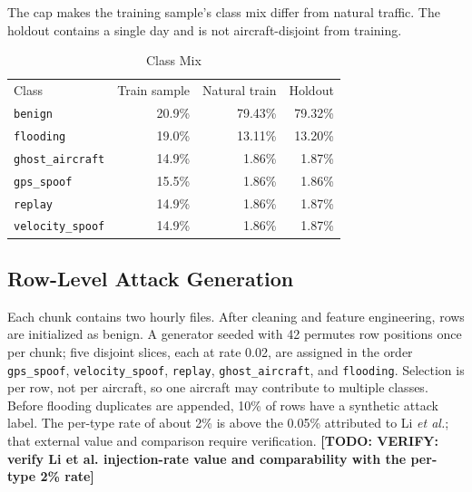 \documentclass[conference]{IEEEtran}
\newcommand{\todo}[1]{\textbf{[TODO: #1]}}
\newcommand{\benign}{\texttt{benign}}
\newcommand{\gps}{\texttt{gps\_spoof}}
\newcommand{\vel}{\texttt{velocity\_spoof}}
\newcommand{\replay}{\texttt{replay}}
\newcommand{\ghost}{\texttt{ghost\_aircraft}}
\newcommand{\flood}{\texttt{flooding}}
\begin{document}
The cap makes the training sample's class mix differ from natural traffic. The holdout contains a single day and is not aircraft-disjoint from training.

\begin{table}[t]\caption{Class Mix}\label{tab:mix}\centering\footnotesize

\begin{tabular}{lrrr}\toprule Class & Train sample & Natural train & Holdout \\

\benign & 20.9\% & 79.43\% & 79.32\% \\

\flood & 19.0\% & 13.11\% & 13.20\% \\

\ghost & 14.9\% & 1.86\% & 1.87\% \\

\gps & 15.5\% & 1.86\% & 1.86\% \\

\replay & 14.9\% & 1.86\% & 1.87\% \\

\vel & 14.9\% & 1.86\% & 1.87\% \\

\bottomrule\end{tabular}\end{table}



\subsection{Row-Level Attack Generation}

Each chunk contains two hourly files. After cleaning and feature engineering, rows are initialized as benign. A generator seeded with 42 permutes row positions once per chunk; five disjoint slices, each at rate 0.02, are assigned in the order \gps, \vel, \replay, \ghost, and \flood. Selection is per row, not per aircraft, so one aircraft may contribute to multiple classes. Before flooding duplicates are appended, 10\% of rows have a synthetic attack label. The per-type rate of about 2\% is above the 0.05\% attributed to Li \emph{et al.}; that external value and comparison require verification. \todo{VERIFY: verify Li et al. injection-rate value and comparability with the per-type 2\% rate}
\end{document}
